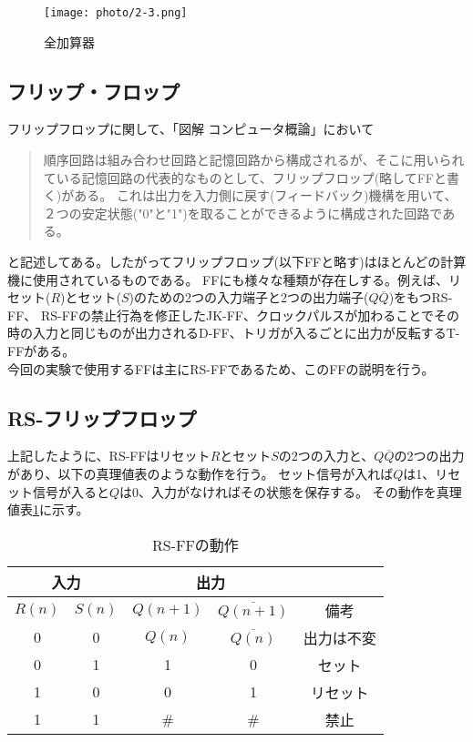 \documentclass[dvipdfmx]{jsarticle}
\begin{document}
\begin{figure*}[h]
  \begin{center}
    \texttt{[image: photo/2-3.png]}
  \end{center}
  \caption{全加算器}
  \label{fig:2-3}
\end{figure*}

\subsection{フリップ・フロップ}

フリップフロップに関して、「図解 コンピュータ概論」\cite[p.106]{computer}において

\begin{quote}
  順序回路は組み合わせ回路と記憶回路から構成されるが、そこに用いられている記憶回路の代表的なものとして、フリップフロップ(略してFFと書く)がある。
  これは出力を入力側に戻す(フィードバック)機構を用いて、２つの安定状態("0"と"1")を取ることができるように構成された回路である。
\end{quote}
と記述してある。したがってフリップフロップ(以下FFと略す)はほとんどの計算機に使用されているものである。
FFにも様々な種類が存在しする。例えば、リセット($R$)とセット($S$)のための2つの入力端子と2つの出力端子($Q$$\overline{Q}$)をもつRS-FF、
RS-FFの禁止行為を修正したJK-FF、クロックパルスが加わることでその時の入力と同じものが出力されるD-FF、トリガが入るごとに出力が反転するT-FFがある。\\
今回の実験で使用するFFは主にRS-FFであるため、このFFの説明を行う。

\subsection*{RS-フリップフロップ}
上記したように、RS-FFはリセット$R$とセット$S$の2つの入力と、$Q\overline{Q}$の2つの出力があり、以下の真理値表のような動作を行う。
セット信号が入れば$Q$は1、リセット信号が入ると$Q$は0、入力がなければその状態を保存する。
その動作を真理値表\ref{tb:2-4}に示す。

\begin{table}
  \caption{RS-FFの動作}
  \centering
  \begin{tabular}{|c|c||c|c|c|} \hline
    \multicolumn{2}{|c||}{入力} & \multicolumn{2}{c|}{出力} & \\ \hline
    $R(n)$ & $S(n)$ & $Q(n+1)$ & $\overline{Q(n+1)}$ &備考\\ \hline
    0 & 0 & $Q(n)$ & $\overline{Q(n)}$ & 出力は不変\\ \hline
    0 & 1 & 1 & 0 & セット\\ \hline
    1 & 0 & 0 & 1 & リセット\\ \hline
    1 & 1 & \# & \# & 禁止\\ \hline
  \end{tabular}
  \label{tb:2-4}
\end{table}
\end{document}
